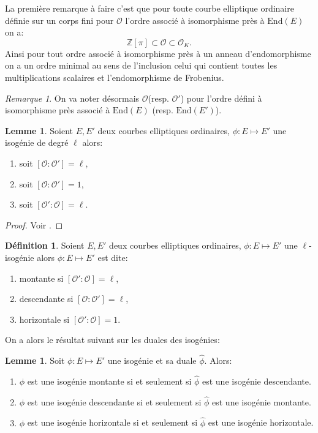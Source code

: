 \documentclass[10pt,a4paper]{book}
\theoremstyle{plain}
\theoremstyle{definition}
\newtheorem{lem}[thm]{Lemme}
\theoremstyle{definition}
\theoremstyle{definition}
\theoremstyle{definition}
\newtheorem{defi}[thm]{Définition}
\theoremstyle{remark}
\newtheorem{rem}[thm]{Remarque}
\theoremstyle{remark}
\theoremstyle{definition}
\begin{document}
La première remarque à faire c'est que pour toute courbe elliptique ordinaire définie sur un corps fini pour $\mathcal{O}$ l'ordre associé à isomorphisme près à $\mathrm{End}(E)$ on a: 
\[
\mathbb{Z}[\pi] \subset \mathcal{O} \subset \mathcal{O}_K.
\]
Ainsi pour tout ordre associé à isomorphisme près à un anneau d'endomorphisme on a un ordre minimal au sens de l'inclusion celui qui contient toutes les multiplications scalaires et l'endomorphisme de Frobenius.

\begin{rem}
On va noter désormais $\mathcal{O}$(resp. $\mathcal{O}'$) pour l'ordre défini à isomorphisme près associé à $\mathrm{End}(E)$ (resp. $\mathrm{End}(E')$).
\end{rem}

\begin{lem}
Soient $E,E'$ deux courbes elliptiques ordinaires, $\phi: E \mapsto E'$ une isogénie de degré $\ell$ alors:
\begin{enumerate}
\item soit $[\mathcal{O} : \mathcal{O'}]=\ell$, 
\item soit $[\mathcal{O} : \mathcal{O'}]=1$,
\item soit $[\mathcal{O'} : \mathcal{O}]=\ell$.
\end{enumerate}
\end{lem}

\begin{proof}
Voir \cite[Proposition 21]{Kohel96}.
\end{proof}

\begin{defi}
\label{def:iso:nom}
Soient $E,E'$ deux courbes elliptiques ordinaires, $\phi: E \mapsto E'$ une $\ell$-isogénie alors $\phi: E \mapsto E'$ est dite:
\begin{enumerate}
\item montante si $[\mathcal{O'} : \mathcal{O}]=\ell$,
\item descendante si $[\mathcal{O} : \mathcal{O'}]=\ell$,
\item horizontale si $[\mathcal{O'} : \mathcal{O}]=1$.
\end{enumerate}
\end{defi}

On a alors le résultat suivant sur les duales des isogénies:
\begin{lem}
\label{lem:dua:vol}
Soit $\phi : E \mapsto E'$ une isogénie et sa duale $\widehat{\phi}$. Alors:
\begin{enumerate}
\item $\phi$ est une isogénie montante si et seulement si $\widehat{\phi}$ est une isogénie descendante.
\item $\phi$ est une isogénie descendante si et seulement si $\widehat{\phi}$ est une isogénie montante.
\item $\phi$ est une isogénie horizontale si et seulement si $\widehat{\phi}$ est une isogénie horizontale.
\end{enumerate}
\end{lem}
\end{document}
